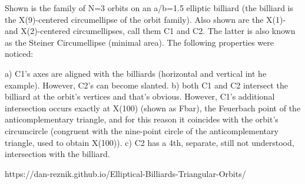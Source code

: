 Shown is the family of N=3 orbits on an a/b=1.5 elliptic billiard (the billiard is the X(9)-centered circumellipse of the orbit family). Also shown are the X(1)- and X(2)-centered circumellipses, call them C1 and C2. The latter is also known as the Steiner Circumellipse (minimal area). The following properties were noticed:

a) C1's axes are aligned with the billiards (horizontal and vertical int he example). However, C2's can become slanted.
b) both C1 and C2 intersect the billiard at the orbit's vertices and that's obvious. However, C1's additional intersection occurs exactly at X(100) (shown as Fbar), the Feuerbach point of the anticomplementary triangle, and for this reason it coincides with the orbit's circumcircle (congruent with the nine-point circle of the anticomplementary triangle, used to obtain X(100)).
c) C2 has a 4th, separate, still not understood, intersection with the billiard.

https://dan-reznik.github.io/Elliptical-Billiards-Triangular-Orbits/